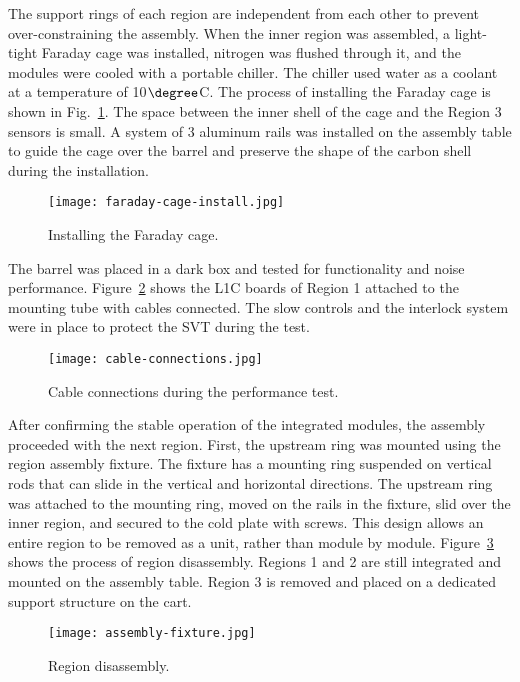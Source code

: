 The support rings of each region are independent from each other to prevent over-constraining the assembly. When the inner region was assembled, a light-tight Faraday cage was installed, nitrogen was flushed through it, and the modules were cooled with a portable chiller. The chiller used water as a coolant at a temperature of 10$\degree$C. The process of installing the Faraday cage is shown in Fig.~\ref{fig:faraday-cage-install}. The space between the inner shell of the cage and the Region 3 sensors is small. A system of 3 aluminum rails was installed on the assembly table to guide the cage over the barrel and preserve the shape of the carbon shell during the installation. 

\begin{figure}[hbt] 
\centering 
\texttt{[image: faraday-cage-install.jpg]}
\caption{Installing the Faraday cage.}
\label{fig:faraday-cage-install}
\end{figure}

The barrel was placed in a dark box and tested for functionality and noise performance. Figure~\ref{fig:cable-connections} shows the L1C boards of Region 1 attached to the mounting tube with cables connected. The slow controls and the interlock system were in place to protect the SVT during the test.

\begin{figure}[hbt] 
\centering 
\texttt{[image: cable-connections.jpg]}
\caption{Cable connections during the performance test.}
\label{fig:cable-connections}
\end{figure}
 
After confirming the stable operation of the integrated modules, the assembly proceeded with the next region. First, the upstream ring was mounted using the region assembly fixture. The fixture has a mounting ring suspended on vertical rods that can slide in the vertical and horizontal directions. The upstream ring was attached to the mounting ring, moved on the rails in the fixture, slid over the inner region, and secured to the cold plate with screws. This design allows an entire region to be removed as a unit, rather than module by module. Figure~\ref{fig:assembly-fixture} shows the process of region disassembly. Regions 1 and 2 are still integrated and mounted on the assembly table. Region 3 is removed and placed on a dedicated support structure on the cart.

\begin{figure}[hbt] 
\centering 
\texttt{[image: assembly-fixture.jpg]}
\caption{Region disassembly.}
\label{fig:assembly-fixture}
\end{figure}

